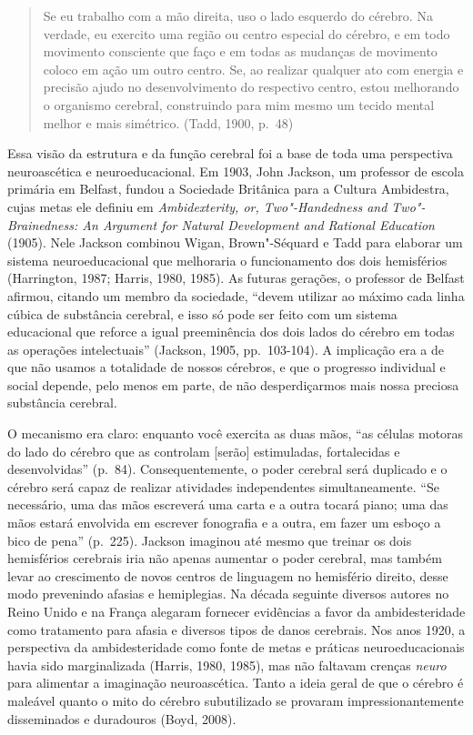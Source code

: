 \begin{quote}
Se eu trabalho com a mão direita, uso o lado esquerdo do cérebro. Na
verdade, eu exercito uma região ou centro especial do cérebro, e em todo
movimento consciente que faço e em todas as mudanças de movimento coloco
em ação um outro centro. Se, ao realizar qualquer ato com energia e
precisão ajudo no desenvolvimento do respectivo centro, estou melhorando
o organismo cerebral, construindo para mim mesmo um tecido mental melhor
e mais simétrico. (Tadd, 1900, p.~48)
\end{quote}

Essa visão da estrutura e da função cerebral foi a base de toda uma
perspectiva neuroascética e neuroeducacional. Em 1903, John Jackson, um
professor de escola primária em Belfast, fundou a Sociedade Britânica
para a Cultura Ambidestra, cujas metas ele definiu em \emph{Ambidexterity, or,
Two"-Handedness and Two"-Brainedness: An Argument for Natural Development
and Rational Education} (1905). Nele Jackson combinou Wigan, Brown"-Séquard
e Tadd para elaborar um sistema neuroeducacional que melhoraria o
funcionamento dos dois hemisférios (Harrington, 1987; Harris, 1980,
1985). As futuras gerações, o professor de Belfast afirmou, citando um
membro da sociedade, ``devem utilizar ao máximo cada linha cúbica de
substância cerebral, e isso só pode ser feito com um sistema educacional
que reforce a igual preeminência dos dois lados do cérebro em todas as
operações intelectuais'' (Jackson, 1905, pp.~103-104). A implicação era a
de que não usamos a totalidade de nossos cérebros, e que o progresso
individual e social depende, pelo menos em parte, de não desperdiçarmos
mais nossa preciosa substância cerebral.

O mecanismo era claro: enquanto você exercita as duas mãos, ``as células
motoras do lado do cérebro que as controlam {[}serão{]} estimuladas,
fortalecidas e desenvolvidas'' (p.~84). Consequentemente, o poder
cerebral será duplicado e o cérebro será capaz de realizar atividades
independentes simultaneamente. ``Se necessário, uma das mãos escreverá
uma carta e a outra tocará piano; uma das mãos estará
envolvida em escrever fonografia e a outra, em fazer um esboço a bico de
pena'' (p.~225). Jackson imaginou até mesmo que treinar os dois
hemisférios cerebrais iria não apenas aumentar o poder cerebral, mas
também levar ao crescimento de novos centros de linguagem no hemisfério
direito, desse modo prevenindo afasias e hemiplegias. Na década seguinte
diversos autores no Reino Unido e na França alegaram fornecer evidências
a favor da ambidesteridade como tratamento para afasia e diversos tipos
de danos cerebrais. Nos anos 1920, a perspectiva da ambidesteridade como
fonte de metas e práticas neuroeducacionais havia sido marginalizada
(Harris, 1980, 1985), mas não faltavam crenças \emph{neuro} para
alimentar a imaginação neuroascética. Tanto a ideia geral de que o
cérebro é maleável quanto o mito do cérebro subutilizado se provaram
impressionantemente disseminados e duradouros (Boyd, 2008).

